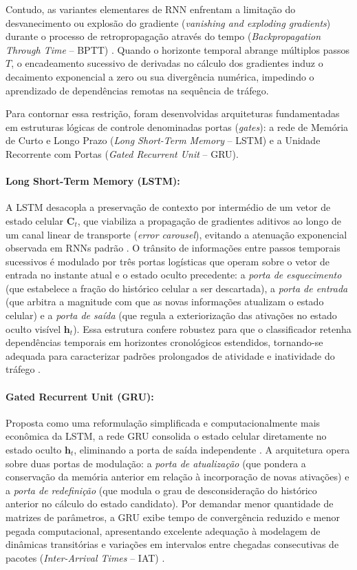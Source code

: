 Contudo, as variantes elementares de RNN enfrentam a limitação do desvanecimento ou explosão do gradiente (\emph{vanishing and exploding gradients}) durante o processo de retropropagação através do tempo (\emph{Backpropagation Through Time} -- BPTT) \cite{survey2025dl}. Quando o horizonte temporal abrange múltiplos passos $T$, o encadeamento sucessivo de derivadas no cálculo dos gradientes induz o decaimento exponencial a zero ou sua divergência numérica, impedindo o aprendizado de dependências remotas na sequência de tráfego.

Para contornar essa restrição, foram desenvolvidas arquiteturas fundamentadas em estruturas lógicas de controle denominadas portas (\emph{gates}): a rede de Memória de Curto e Longo Prazo (\emph{Long Short-Term Memory} -- LSTM) e a Unidade Recorrente com Portas (\emph{Gated Recurrent Unit} -- GRU).

\paragraph{Long Short-Term Memory (LSTM):}
A LSTM desacopla a preservação de contexto por intermédio de um vetor de estado celular $\mathbf{C}_t$, que viabiliza a propagação de gradientes aditivos ao longo de um canal linear de transporte (\emph{error carousel}), evitando a atenuação exponencial observada em RNNs padrão \cite{survey2025dl, temporal2025}. O trânsito de informações entre passos temporais sucessivos é modulado por três portas logísticas que operam sobre o vetor de entrada no instante atual e o estado oculto precedente: a \emph{porta de esquecimento} (que estabelece a fração do histórico celular a ser descartada), a \emph{porta de entrada} (que arbitra a magnitude com que as novas informações atualizam o estado celular) e a \emph{porta de saída} (que regula a exteriorização das ativações no estado oculto visível $\mathbf{h}_t$). Essa estrutura confere robustez para que o classificador retenha dependências temporais em horizontes cronológicos estendidos, tornando-se adequada para caracterizar padrões prolongados de atividade e inatividade do tráfego \cite{temporal2025}.

\paragraph{Gated Recurrent Unit (GRU):}
Proposta como uma reformulação simplificada e computacionalmente mais econômica da LSTM, a rede GRU consolida o estado celular diretamente no estado oculto $\mathbf{h}_t$, eliminando a porta de saída independente \cite{survey2025dl, timematters2025}. A arquitetura opera sobre duas portas de modulação: a \emph{porta de atualização} (que pondera a conservação da memória anterior em relação à incorporação de novas ativações) e a \emph{porta de redefinição} (que modula o grau de desconsideração do histórico anterior no cálculo do estado candidato). Por demandar menor quantidade de matrizes de parâmetros, a GRU exibe tempo de convergência reduzido e menor pegada computacional, apresentando excelente adequação à modelagem de dinâmicas transitórias e variações em intervalos entre chegadas consecutivas de pacotes (\emph{Inter-Arrival Times} -- IAT) \cite{timematters2025}.

